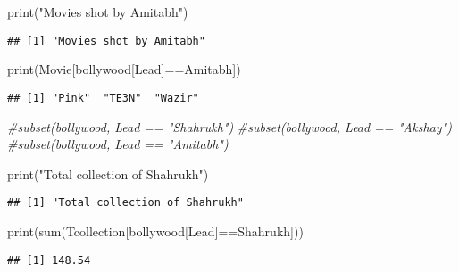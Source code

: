 \documentclass[
]{article}
\newenvironment{Shaded}{\begin{snugshade}}{\end{snugshade}}
\newcommand{\CommentTok}[1]{\textcolor[rgb]{0.56,0.35,0.01}{\textit{#1}}}
\newcommand{\FunctionTok}[1]{\textcolor[rgb]{0.00,0.00,0.00}{#1}}
\newcommand{\NormalTok}[1]{#1}
\newcommand{\SpecialCharTok}[1]{\textcolor[rgb]{0.00,0.00,0.00}{#1}}
\newcommand{\StringTok}[1]{\textcolor[rgb]{0.31,0.60,0.02}{#1}}
\begin{document}
\begin{Shaded}
\begin{Highlighting}[]
\FunctionTok{print}\NormalTok{(}\StringTok{"Movies shot by Amitabh"}\NormalTok{)}
\end{Highlighting}
\end{Shaded}

\begin{verbatim}
## [1] "Movies shot by Amitabh"
\end{verbatim}

\begin{Shaded}
\begin{Highlighting}[]
\FunctionTok{print}\NormalTok{(Movie[bollywood[}\StringTok{\textquotesingle{}Lead\textquotesingle{}}\NormalTok{]}\SpecialCharTok{==}\StringTok{\textquotesingle{}Amitabh\textquotesingle{}}\NormalTok{])}
\end{Highlighting}
\end{Shaded}

\begin{verbatim}
## [1] "Pink"  "TE3N"  "Wazir"
\end{verbatim}

\begin{Shaded}
\begin{Highlighting}[]
\CommentTok{\#subset(bollywood, Lead == "Shahrukh")}
\CommentTok{\#subset(bollywood, Lead == "Akshay")}
\CommentTok{\#subset(bollywood, Lead  == "Amitabh")}

\FunctionTok{print}\NormalTok{(}\StringTok{"Total collection of Shahrukh"}\NormalTok{)}
\end{Highlighting}
\end{Shaded}

\begin{verbatim}
## [1] "Total collection of Shahrukh"
\end{verbatim}

\begin{Shaded}
\begin{Highlighting}[]
\FunctionTok{print}\NormalTok{(}\FunctionTok{sum}\NormalTok{(Tcollection[bollywood[}\StringTok{\textquotesingle{}Lead\textquotesingle{}}\NormalTok{]}\SpecialCharTok{==}\StringTok{\textquotesingle{}Shahrukh\textquotesingle{}}\NormalTok{]))}
\end{Highlighting}
\end{Shaded}

\begin{verbatim}
## [1] 148.54
\end{verbatim}
\end{document}
